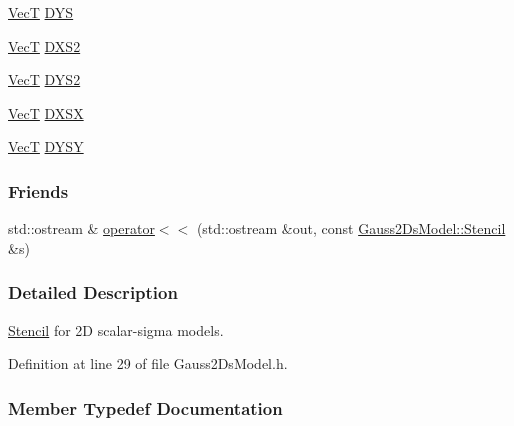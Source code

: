 \begin{DoxyCompactItemize}
\item 
\hyperlink{namespacemappel_a2225ad69f358daa3f4f99282a35b9a3a}{VecT} \hyperlink{classmappel_1_1Gauss2DsModel_1_1Stencil_af4b7f42541c0ae6501560602b0b2148b}{D\+YS}
\item 
\hyperlink{namespacemappel_a2225ad69f358daa3f4f99282a35b9a3a}{VecT} \hyperlink{classmappel_1_1Gauss2DsModel_1_1Stencil_a96208f4eb9459d411a4731f6fb6f92cc}{D\+X\+S2}
\item 
\hyperlink{namespacemappel_a2225ad69f358daa3f4f99282a35b9a3a}{VecT} \hyperlink{classmappel_1_1Gauss2DsModel_1_1Stencil_af88ab1c26e71a1de6d9c0d94187ff3b5}{D\+Y\+S2}
\item 
\hyperlink{namespacemappel_a2225ad69f358daa3f4f99282a35b9a3a}{VecT} \hyperlink{classmappel_1_1Gauss2DsModel_1_1Stencil_a7870df1b758596566193a73f095a1710}{D\+X\+SX}
\item 
\hyperlink{namespacemappel_a2225ad69f358daa3f4f99282a35b9a3a}{VecT} \hyperlink{classmappel_1_1Gauss2DsModel_1_1Stencil_a8d76c66cd342f236d5197aa121549468}{D\+Y\+SY}
\end{DoxyCompactItemize}
\subsubsection*{Friends}
\begin{DoxyCompactItemize}
\item 
std\+::ostream \& \hyperlink{classmappel_1_1Gauss2DsModel_1_1Stencil_a14eea3987ad0af480479e079238f84b2}{operator$<$$<$} (std\+::ostream \&out, const \hyperlink{classmappel_1_1Gauss2DsModel_1_1Stencil}{Gauss2\+Ds\+Model\+::\+Stencil} \&s)
\end{DoxyCompactItemize}


\subsubsection{Detailed Description}
\hyperlink{classmappel_1_1Gauss2DsModel_1_1Stencil}{Stencil} for 2D scalar-\/sigma models. 

Definition at line 29 of file Gauss2\+Ds\+Model.\+h.



\subsubsection{Member Typedef Documentation}
